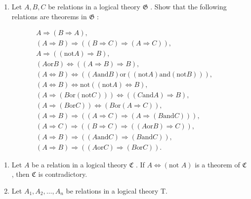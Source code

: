 \exercisegroup

\begin{enumerate}
\def\labelenumi{\arabic{enumi}.}
\tightlist
\item
  Let \(A, B, C\) be relations in a logical theory \(\mathfrak{G}\) . Show that the following relations are theorems in \(\mathfrak{G}\) :
\end{enumerate}

\[
\begin{array}{c} A \Longrightarrow (B \Longrightarrow A), \\ (A \Longrightarrow B) \Longrightarrow ((B \Longrightarrow C) \Longrightarrow (A \Longrightarrow C)), \\ A \Longrightarrow ((\text {not} A) \Longrightarrow B), \\ (A \text {or} B) \Longleftrightarrow ((A \Longrightarrow B) \Longrightarrow B), \\ (A \Longleftrightarrow B) \Longleftrightarrow ((A \text {and} B) \text {or} ((\text {not} A) \text {and} (\text {not} B))), \\ (A \Longleftrightarrow B) \Longleftrightarrow \text {not} ((\text {not} A) \Longleftrightarrow B), \\ (A \Longrightarrow (B \text {or} (\text {not} C))) \Longleftrightarrow ((C \text {and} A) \Longrightarrow B), \\ (A \Longrightarrow (B \text {or} C)) \Longleftrightarrow (B \text {or} (A \Longrightarrow C)), \\ (A \Longrightarrow B) \Longrightarrow ((A \Longrightarrow C) \Longrightarrow (A \Longrightarrow (B \text {and} C))), \\ (A \Longrightarrow C) \Longrightarrow ((B \Longrightarrow C) \Longrightarrow ((A \text {or} B) \Longrightarrow C)), \\ (A \Longrightarrow B) \Longrightarrow ((A \text {and} C) \Longrightarrow (B \text {and} C)), \\ (A \Longrightarrow B) \Longrightarrow ((A \text {or} C) \Longrightarrow (B \text {or} C)). \end{array}
\]

\begin{enumerate}
\def\labelenumi{\arabic{enumi}.}
\setcounter{enumi}{1}
\item
  Let \(A\) be a relation in a logical theory \(\mathfrak{C}\) . If \(A \Longleftrightarrow (\text{not } A)\) is a theorem of \(\mathfrak{C}\) , then \(\mathfrak{C}\) is contradictory.
\item
  Let \(A_{1}, A_{2}, \ldots, A_{n}\) be relations in a logical theory T.
\end{enumerate}

